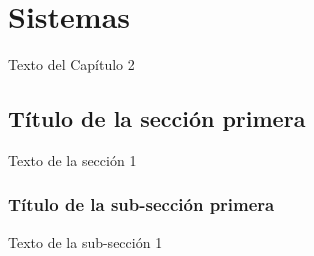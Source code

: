 
\chapter{Sistemas}

Texto del Capítulo 2

\section{Título de la sección primera}

Texto de la sección 1


\subsection{Título de la sub-sección primera}

Texto de la sub-sección 1

